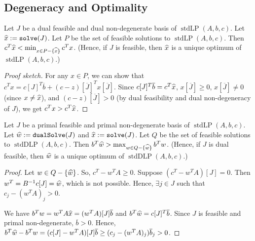 \documentclass[a4paper, 12pt, fleqn]{article}
\newcommand*{\Jcomp}{\overline{J}}
\newcommand*{\bline}{\overline{b}}
\DeclareMathOperator{\stdLP}{stdLP}
\DeclareMathOperator{\stdDLP}{stdDLP}
\DeclareMathOperator{\solve}{\mathtt{solve}}
\DeclareMathOperator{\dualSolve}{\mathtt{dualSolve}}
\begin{document}
\subsection{Degeneracy and Optimality}

\begin{lemma}
Let $J$ be a dual feasible and dual non-degenerate basis of $\stdLP(A, b, c)$.
Let $\xhat \defeq \solve(J)$. Let $P$ be the set of feasible solutions to $\stdLP(A, b, c)$.
Then $c^T\widehat{x} < \min_{x \in P - \{\widehat{x}\}} c^Tx$.
(Hence, if $J$ is feasible, then $\widehat{x}$ is a unique optimum of $\stdLP(A, b, c)$.)
\end{lemma}
\begin{proof}[Proof sketch]
For any $x \in P$, we can show that $c^Tx = c[J]^T\bline + (c-z)[\Jcomp]^Tx[\Jcomp]$.
Since $c[J]^T\bline = c^T\xhat$, $x[\Jcomp] \ge 0$, $x[\Jcomp] \neq 0$ (since $x \neq \widehat{x}$),
and $(c - z)[\Jcomp] > 0$ (by dual feasibility and dual non-degeneracy of $J$),
we get $c^Tx > c^T\widehat{x}$.
\end{proof}

\begin{lemma}
Let $J$ be a primal feasible and primal non-degenerate basis of $\stdLP(A, b, c)$.
Let $\what \defeq \dualSolve(J)$ and $\xhat \defeq \solve(J)$.
Let $Q$ be the set of feasible solutions to $\stdDLP(A, b, c)$.
Then $b^T\widehat{w} > \max_{w \in Q - \{\widehat{w}\}} b^Tw$.
(Hence, if $J$ is dual feasible, then $\widehat{w}$ is a unique optimum of $\stdDLP(A, b, c)$.)
\end{lemma}
\begin{proof}
Let $w \in Q - \{\widehat{w}\}$. So, $c^T - w^TA \ge 0$.
Suppose $(c^T - w^TA)[J] = 0$. Then $w^T = B^{-1}c[J] = \widehat{w}$, which is not possible.
Hence, $\exists j \in J$ such that $c_j - (w^TA)_j > 0$.

We have $b^Tw = w^TA\xhat = (w^TA)[J]\bline$ and $b^T\what = c[J]^T\bline$.
Since $J$ is feasible and primal non-degenerate, $\bline > 0$. Hence,
$b^T\what - b^Tw = (c[J] - w^TA)[J]\bline \ge (c_j - (w^TA)_j)\bline_j > 0$.
\end{proof}
\end{document}
